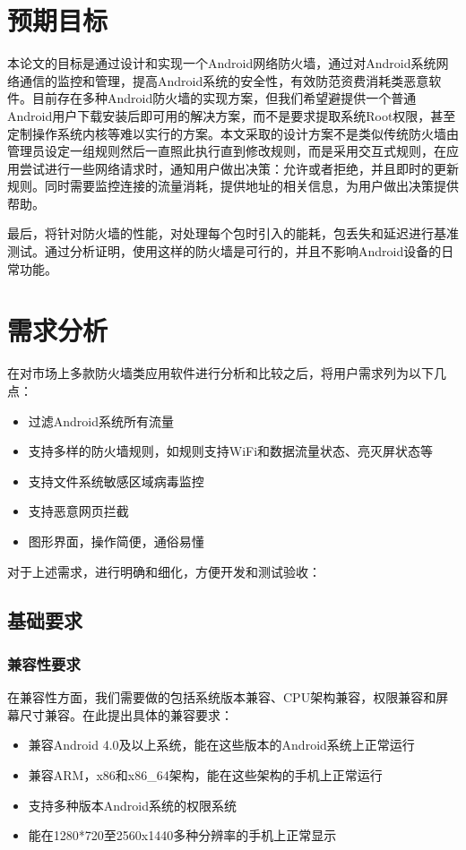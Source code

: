 \documentclass[format=final, language=chinese, degree=fyp]{hustthesis}
\begin{document}
\section{预期目标}

本论文的目标是通过设计和实现一个Android网络防火墙，通过对Android系统网络通信的监控和管理，提高Android系统的安全性，有效防范资费消耗类恶意软件。目前存在多种Android防火墙的实现方案，但我们希望避提供一个普通Android用户下载安装后即可用的解决方案，而不是要求提取系统Root权限，甚至定制操作系统内核等难以实行的方案。本文采取的设计方案不是类似传统防火墙由管理员设定一组规则然后一直照此执行直到修改规则，而是采用交互式规则，在应用尝试进行一些网络请求时，通知用户做出决策：允许或者拒绝，并且即时的更新规则。同时需要监控连接的流量消耗，提供地址的相关信息，为用户做出决策提供帮助。


最后，将针对防火墙的性能，对处理每个包时引入的能耗，包丢失和延迟进行基准测试。通过分析证明，使用这样的防火墙是可行的，并且不影响Android设备的日常功能。

\section{需求分析}

在对市场上多款防火墙类应用软件进行分析和比较之后，将用户需求列为以下几点：
\begin{itemize}
	\item 过滤Android系统所有流量\label{item:1}
	\item 支持多样的防火墙规则，如规则支持WiFi和数据流量状态、亮灭屏状态等
	\item 支持文件系统敏感区域病毒监控
	\item 支持恶意网页拦截
	\item 图形界面，操作简便，通俗易懂
\end{itemize}

对于上述需求，进行明确和细化，方便开发和测试验收：
\subsection{基础要求}

\subsubsection{兼容性要求}
	在兼容性方面，我们需要做的包括系统版本兼容、CPU架构兼容，权限兼容和屏幕尺寸兼容。在此提出具体的兼容要求：

\begin{itemize}
	\item 兼容Android 4.0及以上系统，能在这些版本的Android系统上正常运行
	\item 兼容ARM，x86和x86\_64架构，能在这些架构的手机上正常运行
	\item 支持多种版本Android系统的权限系统
	\item 能在1280*720至2560x1440多种分辨率的手机上正常显示
\end{itemize}
\end{document}
